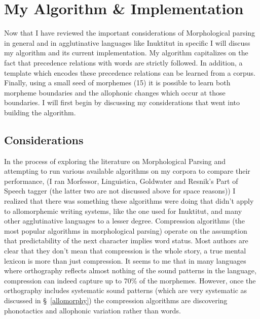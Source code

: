 \documentclass[runningheads,a4paper]{llncs}
\begin{document}
\section{My Algorithm \& Implementation} \label{myalgorithm}

Now that I have reviewed the important considerations of Morphological parsing in general and in agglutinative languages like Inuktitut in specific I will discuss my algorithm and its current implementation. My algorithm capitalizes on the fact that precedence relations with words are strictly followed. In addition, a template which encodes these precedence relations can be learned from a corpus. Finally, using a small seed of morphemes (15) it is possible to learn both morpheme boundaries and the allophonic changes which occur at those boundaries. I will first begin by discussing my considerations that went into building the algorithm.

\subsection{Considerations}

In the process of exploring the literature on Morphological Parsing and attempting to run various available algorithms on my corpora to compare their performance, (I ran Morfessor, Linguistica, Goldwater and Resnik's Part of Speech tagger (the latter two are not discussed above for space reasons)) I realized that there was something these algorithms were doing that didn't apply to allomorphemic writing systems, like the one used for Inuktitut, and many other agglutinative languages to a lesser degree. Compression algorithms (the most popular algorithms in morphological parsing) operate on the assumption that predictability of the next character implies word status. Most authors are clear that they don't mean that compression is the whole story, a true mental lexicon is more than just compression. It seems to me that in many languages where orthography reflects almost nothing of the sound patterns in the language, compression can indeed capture up to 70\% of the morphemes. However, once the orthography includes systematic sound patterns (which are very systematic as discussed in \S~\ref{allomorphy}) the compression algorithms are discovering phonotactics and allophonic variation rather than words. 
\end{document}
